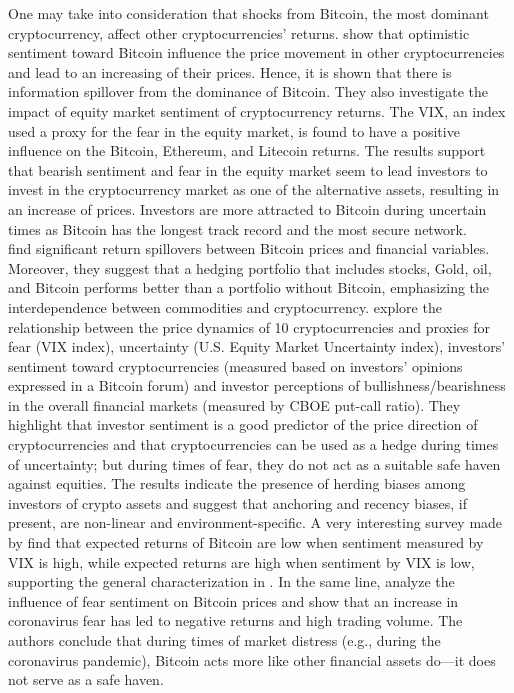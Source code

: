 \documentclass{article}
\begin{document}
	One may take into consideration that shocks from Bitcoin, the most dominant cryptocurrency, affect other cryptocurrencies' returns. \cite{dsic} show that optimistic sentiment toward Bitcoin influence the price movement in other cryptocurrencies and lead to an increasing of their prices. Hence, it is shown that there is information spillover from the dominance of Bitcoin. They also investigate the impact of equity market sentiment of cryptocurrency returns. The VIX, an index used a proxy for the fear in the equity market, is found to have a positive influence on the Bitcoin, Ethereum, and Litecoin returns. The results support that bearish sentiment and fear in the equity market seem to lead investors to invest in the cryptocurrency market as one of the alternative assets, resulting in an increase of prices. Investors are more attracted to Bitcoin during uncertain times as Bitcoin has the longest track record and the most secure network.\\
	\cite{pdwvc} find significant return spillovers between Bitcoin prices and financial variables. Moreover, they suggest that a hedging portfolio that includes stocks, Gold, oil, and Bitcoin performs better than a portfolio without Bitcoin, emphasizing the interdependence between commodities and cryptocurrency. \cite{haaic} explore the relationship between the price dynamics of 10 cryptocurrencies and proxies for fear (VIX index), uncertainty (U.S. Equity Market Uncertainty index), investors’ sentiment toward cryptocurrencies (measured based on investors’ opinions expressed in a Bitcoin forum) and investor perceptions of bullishness/bearishness in the overall financial markets (measured by CBOE put-call ratio). They highlight that investor sentiment is a good predictor of the price direction of cryptocurrencies and that cryptocurrencies can be used as a hedge during times of uncertainty; but during times of fear, they do not act as a suitable safe haven against equities. The results indicate the presence of herding biases among investors of crypto assets and suggest that anchoring and recency biases, if present, are non-linear and environment-specific. A very interesting survey made by \cite{bas} find that expected returns of Bitcoin are low when sentiment measured by VIX is high, while expected returns are high when sentiment by VIX is low, supporting the general characterization in \cite{isits}. In the same line, \cite{fsuab} analyze the influence of fear sentiment on Bitcoin prices and show that an increase in coronavirus fear has led to negative returns and high trading volume. The authors conclude that during times of market distress (e.g., during the coronavirus pandemic), Bitcoin acts more like other financial assets do—it does not serve as a safe haven.
	
\end{document}
